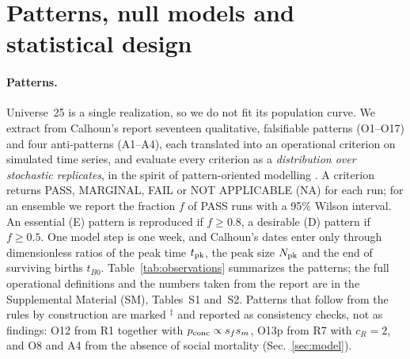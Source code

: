 \providecommand{\extended}{the extended version in the repository}
\section{Patterns, null models and statistical design}
\label{sec:methods}

\paragraph{Patterns.}
Universe~25 is a single realization, so we do not fit its population curve. We extract from Calhoun's report
\cite{Calhoun1973} seventeen qualitative, falsifiable patterns (O1--O17) and four anti-patterns (A1--A4), each
translated into an operational criterion on simulated time series, and evaluate every criterion as a
\emph{distribution over stochastic replicates}, in the spirit of pattern-oriented modelling \cite{Grimm2005}. A
criterion returns PASS, MARGINAL, FAIL or NOT APPLICABLE (NA) for each run; for an ensemble we report the fraction
$f$ of PASS runs with a 95\% Wilson interval. An essential (E) pattern is reproduced if $f\ge0.8$, a desirable (D)
pattern if $f\ge0.5$. One model step is one week, and Calhoun's dates enter only through dimensionless ratios of
the peak time $t_{\rm pk}$, the peak size $N_{\rm pk}$ and the end of surviving births $t_{B0}$.
Table~\ref{tab:observations} summarizes the patterns; the full operational definitions and the numbers taken from
the report are in the Supplemental Material (SM), Tables~S1 and~S2. Patterns that follow from the rules by
construction are marked $^\ddagger$ and reported as consistency checks, not as findings: O12 from R1 together with
$p_{\rm conc}\propto s_fs_m$, O13p from R7 with $c_R=2$, and O8 and A4 from the absence of social mortality
(Sec.~\ref{sec:model}).

